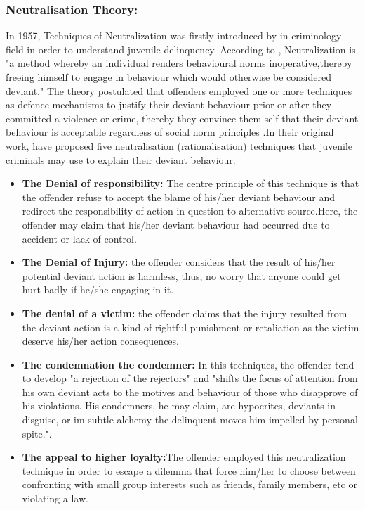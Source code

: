 \subsubsection{Neutralisation Theory:}
In 1957, Techniques of Neutralization was firstly introduced by \citet{Sykes1957} in criminology field in order to understand juvenile delinquency. According to \cite{Rogers1974}, Neutralization is "a method whereby an individual renders behavioural norms inoperative,thereby freeing himself to engage in behaviour which would otherwise be considered deviant." The theory postulated that offenders employed one or more techniques as defence mechanisms to justify their deviant behaviour prior or after they committed a violence or crime, thereby they convince them self that their deviant behaviour is acceptable regardless of social norm principles \cite{Teh2015}.In their original work, \citet{Sykes1957}have proposed five neutralisation (rationalisation) techniques that juvenile criminals may use to explain their deviant behaviour.  
\begin{itemize}
\item \textbf{The Denial of responsibility:} The centre principle of this technique is that the offender refuse to accept the blame of his/her deviant behaviour and redirect the responsibility of action in question to alternative source.Here, the offender may claim that his/her deviant behaviour had occurred due to accident or lack of control\cite{Sykes1957}.   
\item \textbf{The Denial of Injury:} the offender considers that the result of his/her potential deviant action is harmless, thus, no worry that anyone could get hurt badly if he/she engaging in it\cite{Sykes1957}. 
\item \textbf{The denial of a victim:} the offender claims that the injury resulted from the deviant action is a kind of rightful punishment or retaliation as the victim deserve his/her action consequences\cite{Sykes1957}.   
\item \textbf{The condemnation the condemner:} In this techniques, the offender tend to develop "a rejection of the rejectors" and "shifts the focus of attention from his own deviant acts to the motives and behaviour of those who disapprove of his violations. His condemners, he may claim, are hypocrites, deviants in disguise, or im subtle alchemy the delinquent moves him impelled by personal spite."\cite{Sykes1957}.
\item \textbf{The appeal to higher loyalty:}The offender employed this neutralization technique in order to escape a dilemma that force him/her to choose between confronting with small group interests such as friends, family members, etc or violating a law\cite{Sykes1957}.    
\end{itemize}
